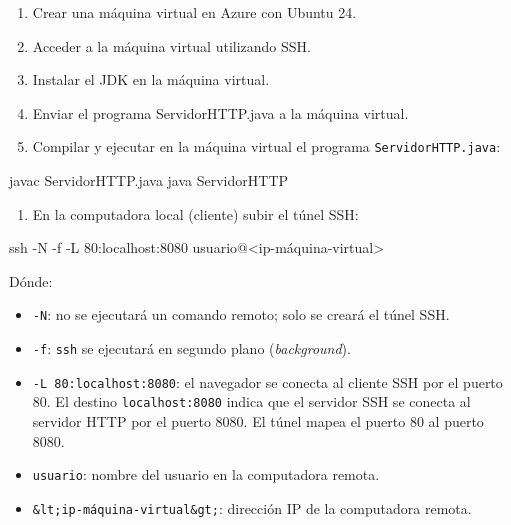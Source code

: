 \begin{enumerate}

\item Crear una máquina virtual en Azure con Ubuntu 24.

\item Acceder a la máquina virtual utilizando SSH.

\item Instalar el JDK en la máquina virtual.

\item Enviar el programa ServidorHTTP.java a la máquina virtual.

\item Compilar y ejecutar en la máquina virtual el programa \texttt{ServidorHTTP.java}:

\end{enumerate}

\begin{SourceCode}
javac ServidorHTTP.java
java ServidorHTTP
\end{SourceCode}

\begin{enumerate}

\item En la computadora local (cliente) subir el túnel SSH:

\end{enumerate}

\begin{SourceCode}
ssh -N -f -L 80:localhost:8080 usuario@<ip-máquina-virtual>
\end{SourceCode}

Dónde:

\begin{itemize}

\item \texttt{-N}: no se ejecutará un comando remoto; solo se creará el túnel SSH.

\item \texttt{-f}: \texttt{ssh} se ejecutará en segundo plano (\emph{background}).

\item \texttt{-L 80:localhost:8080}: el navegador se conecta al cliente SSH por el puerto 80. El destino \texttt{localhost:8080} indica que el servidor SSH se conecta al servidor HTTP por el puerto 8080. El túnel mapea el puerto 80 al puerto 8080.

\item \texttt{usuario}: nombre del usuario en la computadora remota.

\item \texttt{\&lt;ip-máquina-virtual\&gt;}: dirección IP de la computadora remota.

\end{itemize}

